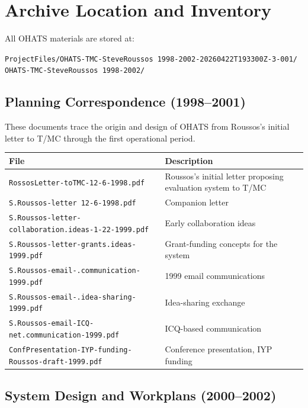 \documentclass[12pt]{article}
\begin{document}
\section{Archive Location and Inventory}

All OHATS materials are stored at:
\begin{center}
\texttt{ProjectFiles/OHATS-TMC-SteveRoussos 1998-2002-20260422T193300Z-3-001/\\
OHATS-TMC-SteveRoussos 1998-2002/}
\end{center}

\subsection{Planning Correspondence (1998--2001)}

These documents trace the origin and design of OHATS from Roussos's
initial letter to T/MC through the first operational period.

\begin{center}
\begin{tabular}{lp{9cm}}
\toprule
File & Description \\
\midrule
\texttt{RossosLetter-toTMC-12-6-1998.pdf} & Roussos's initial letter proposing evaluation system to T/MC \\
\texttt{S.Roussos-letter~12-6-1998.pdf} & Companion letter \\
\texttt{S.Roussos-letter-collaboration.ideas-1-22-1999.pdf} & Early collaboration ideas \\
\texttt{S.Roussos-letter-grants.ideas-1999.pdf} & Grant-funding concepts for the system \\
\texttt{S.Roussos-email-.communication-1999.pdf} & 1999 email communications \\
\texttt{S.Roussos-email-.idea-sharing-1999.pdf} & Idea-sharing exchange \\
\texttt{S.Roussos-email-ICQ-net.communication-1999.pdf} & ICQ-based communication \\
\texttt{ConfPresentation-IYP-funding-Roussos-draft-1999.pdf} & Conference presentation, IYP funding \\
\bottomrule
\end{tabular}
\end{center}

\subsection{System Design and Workplans (2000--2002)}
\end{document}
